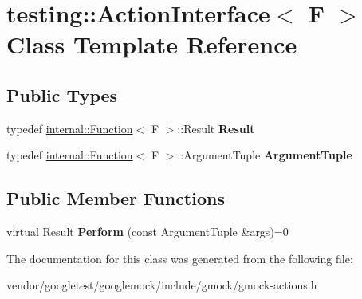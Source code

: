 \hypertarget{classtesting_1_1ActionInterface}{}\section{testing\+:\+:Action\+Interface$<$ F $>$ Class Template Reference}
\label{classtesting_1_1ActionInterface}
\subsection*{Public Types}
\begin{DoxyCompactItemize}
\item 
typedef \hyperlink{structtesting_1_1internal_1_1Function}{internal\+::\+Function}$<$ F $>$\+::Result {\bfseries Result}\hypertarget{classtesting_1_1ActionInterface_a7477de2fe3e4e01c59db698203acaee7}{}\label{classtesting_1_1ActionInterface_a7477de2fe3e4e01c59db698203acaee7}

\item 
typedef \hyperlink{structtesting_1_1internal_1_1Function}{internal\+::\+Function}$<$ F $>$\+::Argument\+Tuple {\bfseries Argument\+Tuple}\hypertarget{classtesting_1_1ActionInterface_af72720d864da4d606629e83edc003511}{}\label{classtesting_1_1ActionInterface_af72720d864da4d606629e83edc003511}

\end{DoxyCompactItemize}
\subsection*{Public Member Functions}
\begin{DoxyCompactItemize}
\item 
virtual Result {\bfseries Perform} (const Argument\+Tuple \&args)=0\hypertarget{classtesting_1_1ActionInterface_a20f8624fcea1786f2992b358760422a0}{}\label{classtesting_1_1ActionInterface_a20f8624fcea1786f2992b358760422a0}

\end{DoxyCompactItemize}


The documentation for this class was generated from the following file\+:\begin{DoxyCompactItemize}
\item 
vendor/googletest/googlemock/include/gmock/gmock-\/actions.\+h\end{DoxyCompactItemize}
